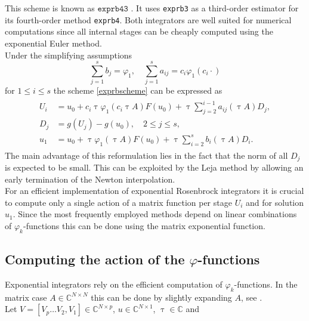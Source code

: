\documentclass{scrartcl}
\begin{document}
	\noindent This scheme is known as $\texttt{exprb43}$ \cite[Example 2.24]{bible}. It uses \texttt{exprb3} as a third-order estimator for its fourth-order method \texttt{exprb4}. Both integrators are well suited for numerical computations since all internal stages can be cheaply computed using the exponential Euler method. \\
	Under the simplifying assumptions
	\[
	\sum_{j=1}^s b_j = \varphi_1, \quad  \sum_{j=1}^s a_{ij} = c_i\varphi_1(c_i\cdot) 
	\]
	for $1\le i\le s$ the scheme \eqref{exprbscheme} can be expressed as 
	\begin{align}
	\begin{split}
	U_i &= u_0 + c_i\uptau\varphi_1(c_i \uptau A)F(u_0) + \uptau\sum_{j=2}^{i-1}a_{ij}(\uptau A)D_j, \\
	D_j &= g(U_j) - g(u_0), \quad 2\le j\le s, \\
	u_1 &= u_0 +    \uptau\varphi_1(    \uptau A)F(u_0) + \uptau\sum_{i=2}^{s}     b_i(\uptau A)D_i.
	\end{split}\label{Djscheme}
	\end{align}
	The main advantage of this reformulation lies in the fact that the norm of all $D_j$ is expected to be small. This can be exploited by the Leja method by allowing an early termination of the Newton interpolation. \\
	For an efficient implementation of exponential Rosenbrock integrators it is crucial to compute only a single action of a matrix function per stage $U_i$ and for solution $u_1$. Since the most frequently employed methods depend on linear combinations of $\varphi_k$-functions this can be done using the matrix exponential function.
	
	\subsection{Computing the action of the $\varphi$-functions}
	Exponential integrators rely on the efficient computation of $\varphi_k$-functions. In the matrix case $A\in\mathbb{C}^{N\times N}$ this can be done by slightly expanding $A$, see \cite[Theorem 2.1]{action}.\\
	Let $V = [V_p\dots V_2, V_1]\in\mathbb{C}^{N\times p}$, $u\in\mathbb{C}^{N\times 1}$, $\uptau\in\mathbb{C}$ and
	
\end{document}
